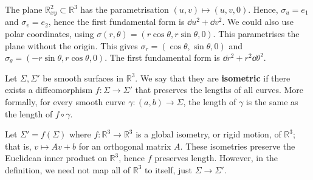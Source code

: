 \documentclass[a4paper,11pt]{article}
\begin{document}
\begin{example}
	The plane \( \mathbb R^2_{xy} \subset \mathbb R^3 \) has the parametrisation \( (u,v) \mapsto (u,v,0) \).
	Hence, \( \sigma_u = e_1 \) and \( \sigma_v = e_2 \), hence the first fundamental form is \( \dd{u}^2 + \dd{v}^2 \).
	We could also use polar coordinates, using \( \sigma(r,\theta) = (r\cos\theta,r\sin\theta,0) \).
	This parametrises the plane without the origin.
	This gives \( \sigma_r = (\cos\theta,\sin\theta,0) \) and \( \sigma_\theta = (-r\sin\theta, r\cos\theta,0) \).
	The first fundamental form is \( \dd{r}^2 + r^2 \dd{\theta}^2 \).
\end{example}
\begin{definition}
	Let \( \Sigma, \Sigma' \) be smooth surfaces in \( \mathbb R^3 \).
	We say that they are \textbf{isometric} if there exists a diffeomorphism \( f\colon \Sigma \to \Sigma' \) that preserves the lengths of all curves.
	More formally, for every smooth curve \( \gamma \colon (a,b) \to \Sigma \), the length of \( \gamma \) is the same as the length of \( f \circ \gamma \).
\end{definition}
\begin{example}
	Let \( \Sigma' = f(\Sigma) \) where \( f \colon \mathbb R^3 \to \mathbb R^3 \) is a global isometry, or rigid motion, of \( \mathbb R^3 \); that is, \( v \mapsto Av+b \) for an orthogonal matrix \( A \).
	These isometries preserve the Euclidean inner product on \( \mathbb R^3 \), hence \( f \) preserves length.
	However, in the definition, we need not map all of \( \mathbb R^3 \) to itself, just \( \Sigma \to \Sigma' \).
\end{example}
\end{document}
